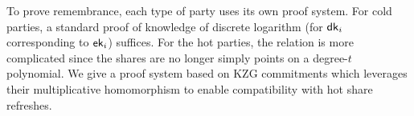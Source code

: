 To prove remembrance, each type of party uses its own proof system. For cold parties, a standard proof of knowledge of discrete logarithm (for $\mathsf{dk}_i$ corresponding to $\mathsf{ek}_i$) suffices. For the hot parties, the relation is more complicated since the shares are no longer simply points on a degree-$t$ polynomial. 
We give a proof system based on KZG commitments which leverages their multiplicative homomorphism to enable compatibility with hot share refreshes. 

